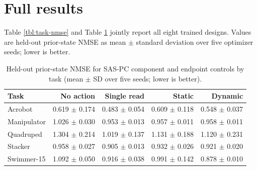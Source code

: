 \section{Full results}\label{full-results}

Table \ref{tbl:task-nmse} and Table \ref{tbl:component-controls} jointly
report all eight trained designs. Values are held-out prior-state NMSE
as mean \(\pm\) standard deviation over five optimizer seeds;
lower is better.

\begin{table}[H]
\centering
\caption{Held-out prior-state NMSE for SAS-PC component and endpoint controls by task (mean \(\pm\) SD over five seeds; lower is better).}
\label{tbl:component-controls}
\small
\begin{tabular}{@{}lrrrr@{}}
\toprule
\textcolor{NVIDIADark}{\textbf{Task}} & \textcolor{NVIDIADark}{\textbf{No action}} & \textcolor{NVIDIADark}{\textbf{Single read}} & \textcolor{NVIDIADark}{\textbf{Static}} & \textcolor{NVIDIADark}{\textbf{Dynamic}} \\
\midrule
Acrobot & 0.619 \(\pm\) 0.174 & 0.483 \(\pm\) 0.054 & 0.609 \(\pm\) 0.118 & 0.548 \(\pm\) 0.037 \\
Manipulator & 1.026 \(\pm\) 0.030 & 0.953 \(\pm\) 0.013 & 0.957 \(\pm\) 0.011 & 0.958 \(\pm\) 0.011 \\
Quadruped & 1.304 \(\pm\) 0.214 & 1.019 \(\pm\) 0.137 & 1.131 \(\pm\) 0.188 & 1.120 \(\pm\) 0.231 \\
Stacker & 0.958 \(\pm\) 0.027 & 0.905 \(\pm\) 0.013 & 0.932 \(\pm\) 0.026 & 0.921 \(\pm\) 0.020 \\
Swimmer-15 & 1.092 \(\pm\) 0.050 & 0.916 \(\pm\) 0.038 & 0.991 \(\pm\) 0.142 & 0.878 \(\pm\) 0.010 \\
\bottomrule
\end{tabular}
\end{table}

